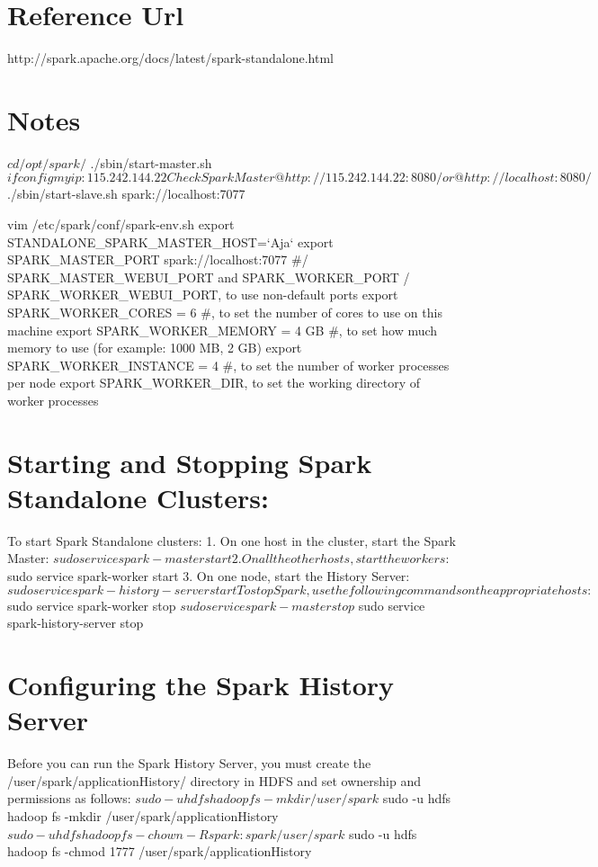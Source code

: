 
\section{Reference Url}
 http://spark.apache.org/docs/latest/spark-standalone.html

\section {Notes}
$ cd /opt/spark/
$ ./sbin/start-master.sh
$ ifconfig
my ip: 115.242.144.22
Check Spark Master @ http://115.242.144.22:8080/ or @ http://localhost:8080/
$ ./sbin/start-slave.sh spark://localhost:7077


vim  /etc/spark/conf/spark-env.sh
export STANDALONE_SPARK_MASTER_HOST=`Aja`
export SPARK_MASTER_PORT spark://localhost:7077
#/ SPARK_MASTER_WEBUI_PORT and SPARK_WORKER_PORT / SPARK_WORKER_WEBUI_PORT, to use non-default ports
export SPARK_WORKER_CORES = 6 #, to set the number of cores to use on this machine
export SPARK_WORKER_MEMORY = 4 GB #, to set how much memory to use (for example: 1000 MB, 2 GB)
export SPARK_WORKER_INSTANCE = 4 #, to set the number of worker processes per node
export SPARK_WORKER_DIR, to set the working directory of worker processes



\section{Starting and Stopping Spark Standalone Clusters:}
To start Spark Standalone clusters:
1. On one host in the cluster, start the Spark Master:
   $ sudo service spark-master start
2. On all the other hosts, start the workers:
   $ sudo service spark-worker start
3. On one node, start the History Server:
   $ sudo service spark-history-server start

To stop Spark, use the following commands on the appropriate hosts:
$ sudo service spark-worker stop
$ sudo service spark-master stop
$ sudo service spark-history-server stop

\section{Configuring the Spark History Server}
Before you can run the Spark History Server, you must create the /user/spark/applicationHistory/ directory in HDFS and
set ownership and permissions as follows:
$ sudo -u hdfs hadoop fs -mkdir /user/spark
$ sudo -u hdfs hadoop fs -mkdir /user/spark/applicationHistory
$ sudo -u hdfs hadoop fs -chown -R spark:spark /user/spark
$ sudo -u hdfs hadoop fs -chmod 1777 /user/spark/applicationHistory

